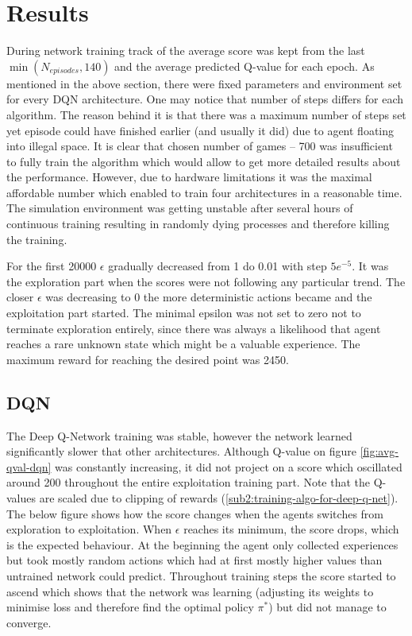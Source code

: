 \chapter{Results}
\label{cha:results}

During network training track of the average score was kept from the last $\min(N_{episodes}, 140)$ and the average predicted Q-value
for each epoch. As mentioned in the above section, there were fixed parameters and environment set for every DQN architecture. One may
notice that number of steps differs for each algorithm. The reason behind it is that there was a maximum number of steps set yet
episode could have finished earlier (and usually it did)  due to agent floating into illegal space. It is clear that chosen number of
games -- 700 was insufficient to fully train the algorithm which would allow to get more detailed results about the performance.
However, due to hardware limitations it was the maximal affordable number which enabled to train four architectures in a reasonable
time. The simulation environment was getting unstable after several hours of continuous training resulting in randomly dying processes
and therefore killing the training.

For the first 20000 $\epsilon$ gradually decreased from 1 do 0.01 with step $5e^{-5}$. It was the exploration part when the scores were
not following any particular trend. The closer $\epsilon$ was decreasing to 0 the more deterministic actions became and the
exploitation part started. The minimal epsilon was not set to zero not to terminate exploration entirely, since there was always a
likelihood that agent reaches a rare unknown state which might be a valuable experience. The maximum reward for reaching the desired
point was 2450.

\section{DQN}
\label{sec:results-dqn}

The Deep Q-Network training was stable, however the network learned significantly slower that other architectures. Although Q-value on
figure \ref{fig:avg-qval-dqn} was constantly increasing, it did not project on a score which oscillated around 200 throughout the
entire exploitation training part. Note that the Q-values are scaled due to clipping of rewards (\ref{sub2:training-algo-for-deep-q-net}). The below figure shows how the score changes when the agents switches from exploration to
exploitation. When $\epsilon$ reaches its minimum, the score drops, which is the expected behaviour. At the beginning the agent only
collected experiences but took mostly random actions which had at first mostly higher values than untrained network could predict.
Throughout training steps the score started to ascend which shows that the network was learning (adjusting its weights to minimise loss
and therefore find the optimal policy $\pi^*$) but did not manage to converge.

